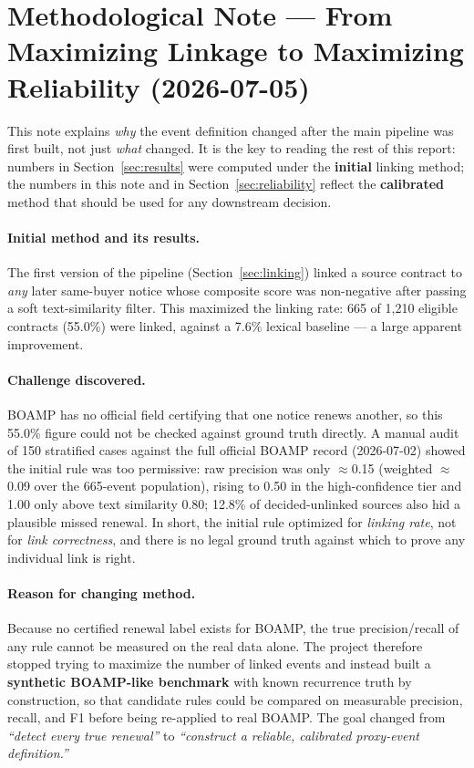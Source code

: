 \documentclass[11pt,a4paper]{article}
\begin{document}
\section*{Methodological Note --- From Maximizing Linkage to Maximizing Reliability (2026-07-05)}

This note explains \emph{why} the event definition changed after the main
pipeline was first built, not just \emph{what} changed. It is the key to
reading the rest of this report: numbers in Section~\ref{sec:results} were
computed under the \textbf{initial} linking method; the numbers in this note
and in Section~\ref{sec:reliability} reflect the \textbf{calibrated} method
that should be used for any downstream decision.

\paragraph{Initial method and its results.}
The first version of the pipeline (Section~\ref{sec:linking}) linked a source
contract to \emph{any} later same-buyer notice whose composite score was
non-negative after passing a soft text-similarity filter. This maximized the
linking rate: 665 of 1{,}210 eligible contracts (55.0\%) were linked, against a
7.6\% lexical baseline --- a large apparent improvement.

\paragraph{Challenge discovered.}
BOAMP has no official field certifying that one notice renews another, so this
55.0\% figure could not be checked against ground truth directly. A manual
audit of 150 stratified cases against the full official BOAMP record
(2026-07-02) showed the initial rule was too permissive: raw precision was only
$\approx$0.15 (weighted $\approx$0.09 over the 665-event population), rising to
0.50 in the high-confidence tier and 1.00 only above text similarity 0.80; 12.8\%
of decided-unlinked sources also hid a plausible missed renewal. In short, the
initial rule optimized for \emph{linking rate}, not for \emph{link
correctness}, and there is no legal ground truth against which to prove any
individual link is right.

\paragraph{Reason for changing method.}
Because no certified renewal label exists for BOAMP, the true precision/recall
of any rule cannot be measured on the real data alone. The project therefore
stopped trying to maximize the number of linked events and instead built a
\textbf{synthetic BOAMP-like benchmark} with known recurrence truth by
construction, so that candidate rules could be compared on measurable
precision, recall, and F1 before being re-applied to real BOAMP. The goal
changed from \emph{``detect every true renewal''} to \emph{``construct a
reliable, calibrated proxy-event definition.''}
\end{document}
